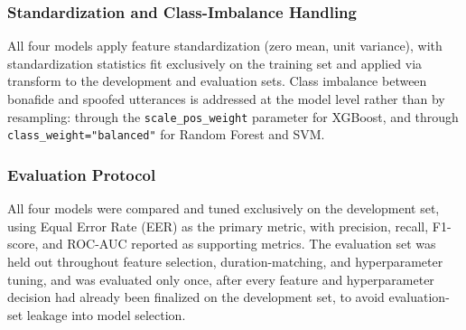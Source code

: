 \subsubsection{Standardization and Class-Imbalance Handling}

All four models apply feature standardization (zero mean, unit variance), with standardization statistics fit exclusively on the training set and applied via transform to the development and evaluation sets. Class imbalance between bonafide and spoofed utterances is addressed at the model level rather than by resampling: through the \texttt{scale\_pos\_weight} parameter for XGBoost, and through \texttt{class\_weight="balanced"} for Random Forest and SVM.

\subsubsection{Evaluation Protocol}

All four models were compared and tuned exclusively on the development set, using Equal Error Rate (EER) as the primary metric, with precision, recall, F1-score, and ROC-AUC reported as supporting metrics. The evaluation set was held out throughout feature selection, duration-matching, and hyperparameter tuning, and was evaluated only once, after every feature and hyperparameter decision had already been finalized on the development set, to avoid evaluation-set leakage into model selection.